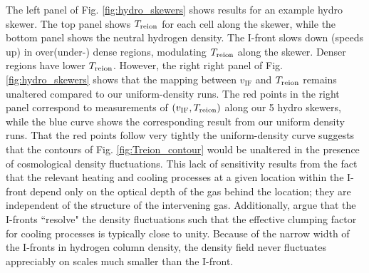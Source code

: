 \documentclass[twocolumn]{aastex62}
\newcommand{\Treion}{T_{\rm reion}}
\newcommand{\vIF}{v_{\mathrm{IF}}}
\begin{document}
\begin{appendix}
{The left panel of Fig. \ref{fig:hydro_skewers} shows results for an example hydro skewer.  The top panel shows $\Treion$ for each cell along the skewer, while the bottom panel shows the neutral hydrogen density.   The I-front slows down (speeds up) in over(under-) dense regions, modulating $\Treion$ along the skewer.  Denser regions have lower $\Treion$.  { However, the right right panel of Fig. \ref{fig:hydro_skewers} shows that the mapping between $\vIF$ and $\Treion$ remains unaltered compared to our uniform-density runs.}   The red points in the right panel correspond to measurements of $(\vIF, \Treion)$ along our 5 hydro skewers, while the blue curve shows the corresponding result from our uniform density runs.  That the red points follow very tightly the uniform-density curve suggests that the contours of Fig. \ref{fig:Treion_contour} would be unaltered in the presence of cosmological density fluctuations.  This lack of sensitivity results from the fact that the relevant heating and cooling processes at a given location within the I-front depend only on the optical depth of the gas behind the location; they are independent of the structure of the intervening gas.  Additionally, \citet{2016MNRAS.457.3006D} argue that the I-fronts ``resolve" the density fluctuations such that the effective clumping factor for cooling processes is typically close to unity.  Because of the narrow width of the I-fronts in hydrogen column density, the density field never fluctuates appreciably on scales much smaller than the I-front.} 





\end{appendix}
\end{document}
